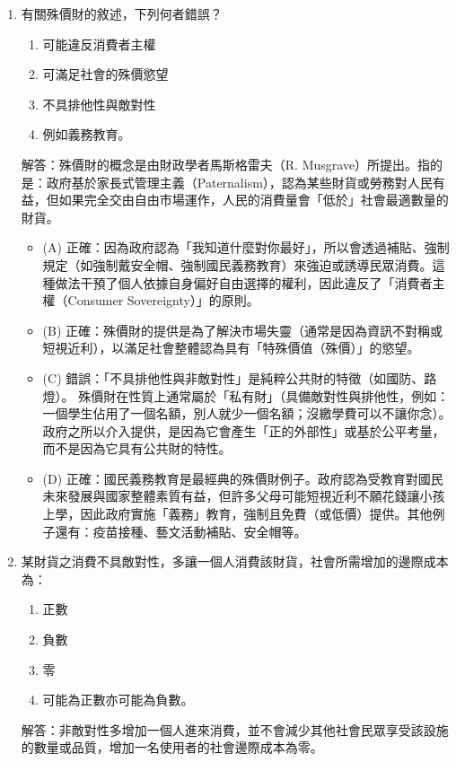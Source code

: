 \documentclass[12pt, a4paper]{article}
\begin{document}
\begin{enumerate}
    \item 有關殊價財的敘述，下列何者錯誤？
    \begin{enumerate}[label=\Alph*.]
        \item 可能違反消費者主權
        \item 可滿足社會的殊價慾望
        \item 不具排他性與敵對性
        \item 例如義務教育。
    \end{enumerate}
    解答：殊價財的概念是由財政學者馬斯格雷夫（R. Musgrave）所提出。指的是：政府基於家長式管理主義（Paternalism），認為某些財貨或勞務對人民有益，但如果完全交由自由市場運作，人民的消費量會「低於」社會最適數量的財貨。
    \begin{itemize}
        \item (A) 正確：因為政府認為「我知道什麼對你最好」，所以會透過補貼、強制規定（如強制戴安全帽、強制國民義務教育）來強迫或誘導民眾消費。這種做法干預了個人依據自身偏好自由選擇的權利，因此違反了「消費者主權（Consumer Sovereignty）」的原則。
        \item (B) 正確：殊價財的提供是為了解決市場失靈（通常是因為資訊不對稱或短視近利），以滿足社會整體認為具有「特殊價值（殊價）」的慾望。
        \item (C) 錯誤：「不具排他性與非敵對性」是純粹公共財的特徵（如國防、路燈）。 殊價財在性質上通常屬於「私有財」（具備敵對性與排他性，例如：一個學生佔用了一個名額，別人就少一個名額；沒繳學費可以不讓你念）。政府之所以介入提供，是因為它會產生「正的外部性」或基於公平考量，而不是因為它具有公共財的特性。
        \item (D) 正確：國民義務教育是最經典的殊價財例子。政府認為受教育對國民未來發展與國家整體素質有益，但許多父母可能短視近利不願花錢讓小孩上學，因此政府實施「義務」教育，強制且免費（或低價）提供。其他例子還有：疫苗接種、藝文活動補貼、安全帽等。
    \end{itemize}

    \item 某財貨之消費不具敵對性，多讓一個人消費該財貨，社會所需增加的邊際成本為：
    \begin{enumerate}[label=\Alph*.]
        \item 正數
        \item 負數
        \item 零
        \item 可能為正數亦可能為負數。
    \end{enumerate}
    解答：非敵對性多增加一個人進來消費，並不會減少其他社會民眾享受該設施的數量或品質，增加一名使用者的社會邊際成本為零。


\end{enumerate}
\end{document}
